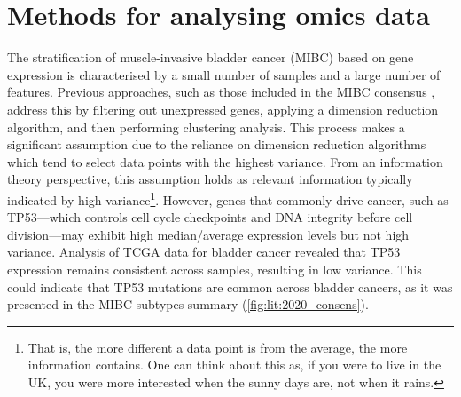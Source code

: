 
\section{Methods for analysing omics data} \label{s:lit:multi-omics}

\vspace{3mm}
\vspace{3mm}



The stratification of muscle-invasive bladder cancer (MIBC) based on gene expression is characterised by a small number of samples and a large number of features. Previous approaches, such as those included in the MIBC consensus \cite{Kamoun2020-tj}, address this by filtering out unexpressed genes, applying a dimension reduction algorithm, and then performing clustering analysis. This process makes a significant assumption due to the reliance on dimension reduction algorithms which tend to select data points with the highest variance. From an information theory perspective, this assumption holds as relevant information typically indicated by high variance\footnote{That is, the more different a data point is from the average, the more information contains. One can think about this as, if you were to live in the UK, you were more interested when the sunny days are, not when it rains.}. However, genes that commonly drive cancer, such as TP53—which controls cell cycle checkpoints and DNA integrity before cell division—may exhibit high median/average expression levels but not high variance. Analysis of TCGA data for bladder cancer \cite{Tcga2018-sj, Robertson2017-mg} revealed that TP53 expression remains consistent across samples, resulting in low variance. This could indicate that TP53 mutations are common across bladder cancers, as it was presented in the MIBC subtypes summary (\cref{fig:lit:2020_consens}).

